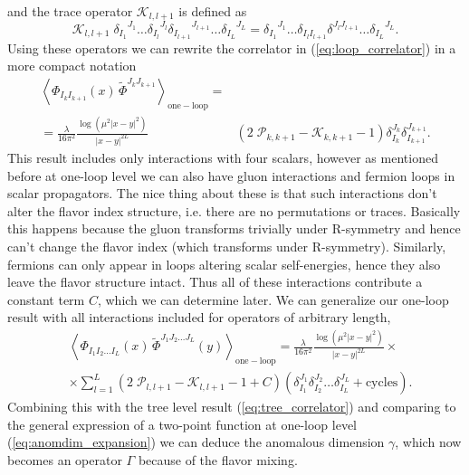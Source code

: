 and the trace operator $\mathcal{K}_{l,l+1}$ is defined as
\begin{equation}
	\label{eq:spin_contract}
	\mathcal{K}_{l,l+1} \; {\delta_{I_{1}}}^{J_{1}} \dots {\delta_{I_{l}}}^{J_{l}} {\delta_{I_{l+1}}}^{J_{l+1}} \dots {\delta_{I_{L}}}^{J_{L}} = {\delta_{I_{1}}}^{J_{1}} \dots {\delta_{I_l I_{l+1}}} {\delta}^{J_{l} J_{l+1}} \dots {\delta_{I_{L}}}^{J_{L}}.
\end{equation}
Using these operators we can rewrite the correlator in (\ref{eq:loop_correlator}) in a more compact notation
\begin{eqnarray}
	  \left< \Phi_{I_k I_{k+1}}(x) \, \tilde{\Phi}^{J_k J_{k+1}} \right>_{\mathrm{one-loop}} = &  \nonumber \\
	  = \frac{\lambda}{16\pi^2} \frac{\log (\mu^2|x-y|^2)}{|x-y|^{2L}} 
	 & \left( 2 \; \mathcal{P}_{k,k+1} - \mathcal{K}_{k,k+1} - 1 \right) \delta_{I_k}^{J_{k}} \delta_{I_{k+1}}^{J_{k+1}}.
\end{eqnarray}
This result includes only interactions with four scalars, however as mentioned before at one-loop level we can also have gluon interactions and fermion loops in scalar propagators. 
The nice thing about these is that such interactions don't alter the flavor index structure, i.e. there are no permutations or traces. 
Basically this happens because the gluon transforms trivially under R-symmetry and hence can't change the flavor index (which transforms under R-symmetry). 
Similarly, fermions can only appear in loops altering scalar self-energies, hence they also leave the flavor structure intact.
Thus all of these interactions contribute a constant term $C$, which we can determine later. We can generalize our one-loop result with all interactions included for operators of arbitrary length,
\begin{equation}
\begin{split}
	 & \left< \Phi_{I_1 I_2 \dots I_L}(x) \, \tilde{\Phi}^{J_1 J_2 \dots J_L}(y)  \right>_{\mathrm{one-loop}}
	  = \frac{\lambda}{16\pi^2} \frac{\log (\mu^2|x-y|^2)}{|x-y|^{2L}} \times \nonumber \\
	 & \times \sum_{l=1}^L \left( 2 \; \mathcal{P}_{l,l+1} - \mathcal{K}_{l,l+1} - 1 + C\right)
	  \left( \delta_{I_1}^{J_1} \delta_{I_2}^{J_2} \dots \delta_{I_L}^{J_L} + \mathrm{cycles} \right).
\end{split}
\end{equation}
Combining this with the tree level result (\ref{eq:tree_correlator}) and comparing to the general expression of a two-point function at one-loop level (\ref{eq:anomdim_expansion}) we can deduce the anomalous dimension $\gamma$, which now becomes an operator $\Gamma$ because of the flavor mixing. 
